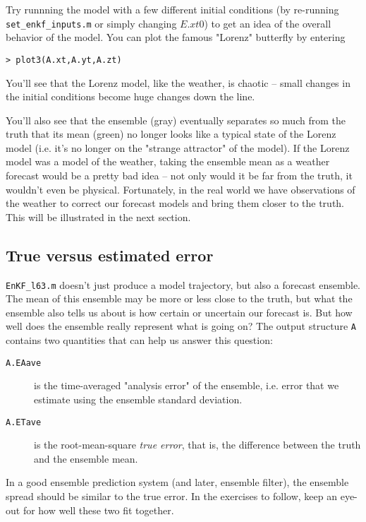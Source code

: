 Try runnning the model with a few different initial conditions (by re-running \texttt{set\_enkf\_inputs.m} or simply changing $E.xt0$) to get an idea of the overall behavior of the model. 
You can plot the famous "Lorenz" butterfly by entering 
\begin{verbatim}
> plot3(A.xt,A.yt,A.zt) 
\end{verbatim}
You'll see that the Lorenz model, like the weather, is chaotic -- small changes in the initial conditions become huge changes down the line. 

You'll also see that the ensemble (gray) eventually separates so much from the truth that its mean (green) no longer looks like a typical state of the Lorenz model (i.e. it's no longer on the "strange attractor" of the model). 
If the Lorenz model was a model of the weather, taking the ensemble mean as a weather forecast would be a pretty bad idea -- not only would it be far from the truth, it wouldn't even be physical. 
Fortunately, in the real world we have observations of the weather to correct our forecast models and bring them closer to the truth. 
This will be illustrated in the next section. 

\subsection{True versus estimated error}

\texttt{EnKF\_l63.m} doesn't just produce a model trajectory, but also a forecast ensemble. 
The mean of this ensemble may be more or less close to the truth, but what the ensemble also tells us about is how certain or uncertain our forecast is. 
But how well does the ensemble really represent what is going on?
The output structure \texttt{A} contains two quantities that can help us answer this question:
\begin{description}
\item [\texttt{A.EAave}] is the time-averaged "analysis error" of the ensemble, i.e. error that we estimate using the ensemble standard deviation. 
\item [\texttt{A.ETave}] is the root-mean-square \textit{true error}, that is, the difference between the truth and the ensemble mean.  
\end{description}

In a good ensemble prediction system (and later, ensemble filter), the ensemble spread should be similar to the true error. 
In the exercises to follow, keep an eye-out for how well these two fit together. 
